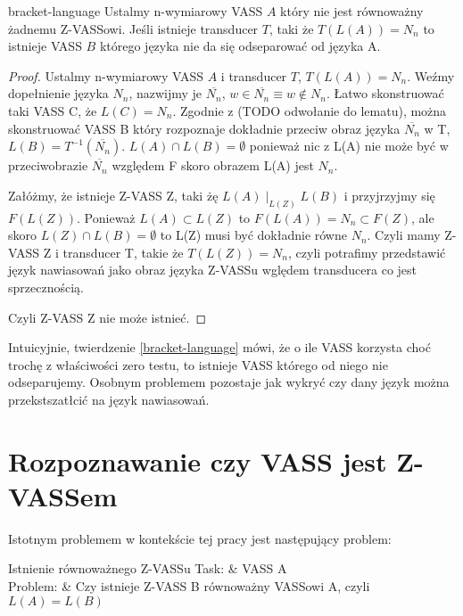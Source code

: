     \begin{theorem} {bracket-language}
        Ustalmy n-wymiarowy VASS $A$ który nie jest równoważny żadnemu Z-VASSowi.
        Jeśli istnieje transducer $T$, taki że $T(L(A)) = N_n$ to istnieje VASS $B$ którego języka nie da się odseparować od języka A.
    \end{theorem}
    \begin{proof}
        Ustalmy n-wymiarowy VASS $A$ i transducer $T$, $T(L(A)) = N_n$.
        Weźmy dopełnienie języka $N_n$, nazwijmy je $\overline{N_n}$, $w \in \overline{N_n} \equiv w \notin N_n$.
        Łatwo skonstruować taki VASS C, że $L(C) = N_n$.
        Zgodnie z (TODO odwołanie do lematu), można skonstruować VASS B który rozpoznaje dokładnie przeciw obraz języka
        $\overline{N_n}$ w T, $L(B) = T^{-1}(\overline{N_n})$.
        $L(A) \cap L(B) = \emptyset$ ponieważ nic z L(A) nie może być w przeciwobrazie $\overline{N_n}$ względem F skoro obrazem L(A) jest $N_n$.

        Załóżmy, że istnieje Z-VASS Z, taki żę $L(A) \mid_{L(Z)} L(B)$ i przyjrzyjmy się $F(L(Z))$.
        Ponieważ $L(A) \subset L(Z)$ to $F(L(A)) = N_n \subset F(Z)$, ale skoro $L(Z) \cap L(B) = \emptyset$ to L(Z) musi być dokładnie równe $N_n$.
        Czyli mamy Z-VASS Z i transducer T, takie że $T(L(Z)) = N_n$, czyli potrafimy przedstawić język nawiasowań jako obraz
        języka Z-VASSu wględem transducera co jest sprzecznością.

        Czyli Z-VASS Z nie może istnieć.

    \end{proof}

    Intuicyjnie, twierdzenie \ref{bracket-language} mówi, że o ile VASS korzysta choć trochę z właściwości zero testu,
    to istnieje VASS którego od niego nie odseparujemy.
    Osobnym problemem pozostaje jak wykryć czy dany język można przekstszatłcić na język nawiasowań.


    \section{Rozpoznawanie czy VASS jest Z-VASSem}
    Istotnym problemem w kontekście tej pracy jest następujący problem:

    \begin{problem}[]{Istnienie równoważnego Z-VASSu}
        Task: & VASS A\\
        Problem: & Czy istnieje  Z-VASS B równoważny VASSowi A, czyli $L(A) = L(B)$ \\
    \end{problem}


